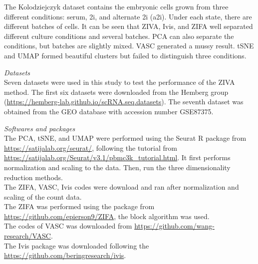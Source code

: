 The Kolodziejczyk dataset contains the embryonic cells grown from three different conditions: serum, 2i, and alternate 2i (a2i). Under each state, there are different batches of cells. It can be seen that ZIVA, Ivis, and ZIFA well separated different culture conditions and several batches. PCA can also separate the conditions, but batches are slightly mixed. VASC generated a mussy result. tSNE and UMAP formed beautiful clusters but failed to distinguish three conditions.

\vspace{0.5cm}
\noindent\emph{Datasets} \\
Seven datasets were used in this study to test the performance of the ZIVA method. The first six datasets were downloaded from the Hemberg group (\url{https://hemberg-lab.github.io/scRNA.seq.datasets}). The seventh dataset was obtained from the GEO database with accession number GSE87375.

\vspace{0.5cm}
\noindent\emph{Softwares and packages} \\
The PCA, tSNE, and UMAP were performed using the Seurat R package from \url{https://satijalab.org/seurat/}, following the tutorial from \url{https://satijalab.org/Seurat/v3.1/pbmc3k_tutorial.html}. It first performs normalization and scaling to the data. Then, run the three dimensionality reduction methods.\\
The ZIFA, VASC, Ivis codes were download and ran after normalization and scaling of the count data.\\
The ZIFA was performed using the package from \url{https://github.com/epierson9/ZIFA}, the block algorithm was used.\\
The codes of VASC was downloaded from \url{https://github.com/wang-research/VASC}.\\
The Ivis package was downloaded following the \url{https://github.com/beringresearch/ivis}.

